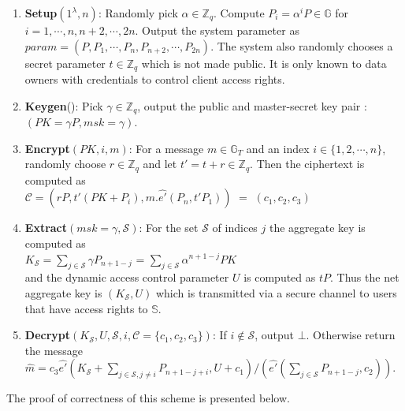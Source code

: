 \begin{enumerate}
 \item \textbf{Setup}$(1^{\lambda},n)$: Randomly pick $\alpha \in \mathbb{Z}_q$. Compute $P_i = {\alpha^{i}}P \in \mathbb{G}$ for $i = 1,\cdots,n,n+2,\cdots,2n$. Output the system parameter as\\
 $param = (P,P_1,\cdots,P_n,P_{n+2},\cdots,P_{2n})$. The system also randomly chooses a secret parameter $t \in \mathbb{Z}_q$ which is not made public. It is only known to data owners with credentials to control client access rights.
 \item \textbf{Keygen}(): Pick $\gamma \in \mathbb{Z}_q$, output the public and master-secret key pair : \\$(PK={\gamma}P,msk=\gamma)$.
 \item \textbf{Encrypt}$(PK,i,m)$: For a message $m \in \mathbb{G}_T$ and an index $i \in \{1,2,\cdots,n\}$, randomly choose $r\in\mathbb{Z}_q$ and let $t'=t+r \in\mathbb{Z}_q$. Then the ciphertext is computed as\\ $\mathcal{C}=(rP,t'{(PK+P_i)},m.\hat{e'}(P_n,t'P_1))$ $=$ $(c_1,c_2,c_3)$
 \item \textbf{Extract}$(msk=\gamma,\mathcal{S})$: For the set $\mathcal{S}$ of indices $j$ the aggregate key is computed as\\ $K_{\mathcal{S}} = \sum_{j\in\mathcal{S}}{\gamma}P_{n+1-j}$ = $\sum_{j\in\mathcal{S}}\alpha^{n+1-j}PK$\\ and the dynamic access control parameter $U$ is computed as $tP$. Thus the net aggregate key is $(K_{\mathcal{S}},U)$ which is transmitted via a secure channel to users that have access rights to $\mathbb{S}$.
 \item \textbf{Decrypt}$(K_{\mathcal{S}}, U, \mathcal{S},i,\mathcal{C}=\{c_1,c_2,c_3\})$: If $i\notin\mathcal{S}$, output $\bot$. Otherwise return the message\\ $\hat{m}=c_3\hat{e'}(K_{\mathcal{S}}+\sum_{j\in\mathcal{S},j\neq i}P_{n+1-j+i},U+c_1)/(\hat{e'}(\sum_{j\in\mathcal{S}}P_{n+1-j},c_2))$. 
\end{enumerate}

The proof of correctness of this scheme is presented below.

